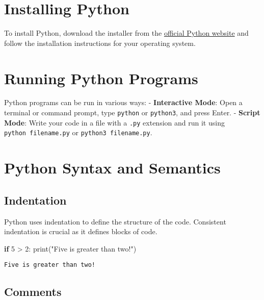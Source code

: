 \documentclass[
  letterpaper,
  DIV=11,
  numbers=noendperiod]{scrreprt}
\newenvironment{Shaded}{\begin{snugshade}}{\end{snugshade}}
\newcommand{\BuiltInTok}[1]{\textcolor[rgb]{0.00,0.23,0.31}{#1}}
\newcommand{\ControlFlowTok}[1]{\textcolor[rgb]{0.00,0.23,0.31}{\textbf{#1}}}
\newcommand{\DecValTok}[1]{\textcolor[rgb]{0.68,0.00,0.00}{#1}}
\newcommand{\NormalTok}[1]{\textcolor[rgb]{0.00,0.23,0.31}{#1}}
\newcommand{\OperatorTok}[1]{\textcolor[rgb]{0.37,0.37,0.37}{#1}}
\newcommand{\StringTok}[1]{\textcolor[rgb]{0.13,0.47,0.30}{#1}}
\begin{document}
\section{Installing Python}\label{installing-python-1}

To install Python, download the installer from the
\href{https://www.python.org/downloads/}{official Python website} and
follow the installation instructions for your operating system.

\section{Running Python Programs}\label{running-python-programs}

Python programs can be run in various ways: - \textbf{Interactive Mode}:
Open a terminal or command prompt, type \texttt{python} or
\texttt{python3}, and press Enter. - \textbf{Script Mode}: Write your
code in a file with a \texttt{.py} extension and run it using
\texttt{python\ filename.py} or \texttt{python3\ filename.py}.

\section{Python Syntax and Semantics}\label{python-syntax-and-semantics}

\subsection{Indentation}\label{indentation}

Python uses indentation to define the structure of the code. Consistent
indentation is crucial as it defines blocks of code.

\begin{Shaded}
\begin{Highlighting}[]
\ControlFlowTok{if} \DecValTok{5} \OperatorTok{\textgreater{}} \DecValTok{2}\NormalTok{:}
    \BuiltInTok{print}\NormalTok{(}\StringTok{"Five is greater than two!"}\NormalTok{)}
\end{Highlighting}
\end{Shaded}

\begin{verbatim}
Five is greater than two!
\end{verbatim}

\subsection{Comments}\label{comments}
\end{document}
